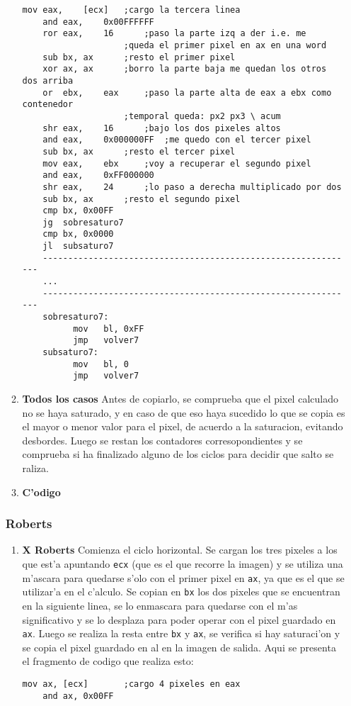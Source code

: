 \documentclass[11pt]{article}
\begin{document}
\begin{enumerate}
\begin{enumerate}
\begin{lstlisting}[frame=single]
	mov	eax,	[ecx]	;cargo la tercera linea
	and	eax,	0x00FFFFFF
	ror	eax,	16		;paso la parte izq a der i.e. me 
					;queda el primer pixel en ax en una word
	sub	bx,	ax		;resto el primer pixel
	xor	ax,	ax		;borro la parte baja me quedan los otros dos arriba
	or	ebx,	eax		;paso la parte alta de eax a ebx como contenedor 
					;temporal queda: px2 px3 \ acum
	shr	eax,	16		;bajo los dos pixeles altos
	and	eax,	0x000000FF	;me quedo con el tercer pixel
	sub	bx,	ax		;resto el tercer pixel
	mov	eax,	ebx		;voy a recuperar el segundo pixel
	and	eax,	0xFF000000
	shr	eax,	24		;lo paso a derecha multiplicado por dos
	sub	bx,	ax		;resto el segundo pixel
	cmp	bx,	0x00FF
	jg	sobresaturo7
	cmp	bx,	0x0000
	jl	subsaturo7
	--------------------------------------------------------------
	...
	--------------------------------------------------------------
	sobresaturo7:
	      mov	bl,	0xFF
	      jmp	volver7
	subsaturo7:
	      mov	bl,	0
	      jmp	volver7
\end{lstlisting}
\item \textbf{Todos los casos}
\subitem Antes de copiarlo, se comprueba que el pixel calculado no se haya saturado, y en caso de que eso haya sucedido lo que se copia es el mayor o menor valor para el pixel, de acuerdo a la saturacion, evitando desbordes.
Luego se restan los contadores corresopondientes y se comprueba si ha finalizado alguno de los ciclos para decidir que salto se raliza.
\item \textbf{C'odigo}
\end{enumerate}

\subsubsection{Roberts} 
\begin{enumerate}
\item \textbf{X Roberts}
\subitem Comienza el ciclo horizontal. Se cargan los tres pixeles a los que est'a apuntando \verb'ecx' (que es el que recorre la imagen) y se utiliza una m'ascara para quedarse s'olo con el primer pixel en \verb'ax', ya que es el que se utilizar'a en el c'alculo.
Se copian en \verb'bx' los dos pixeles que se encuentran en la siguiente linea, se lo enmascara para quedarse con el m'as significativo y se lo desplaza para poder operar con el pixel guardado en \verb'ax'.
Luego se realiza la resta entre \verb'bx' y \verb'ax', se verifica si hay saturaci'on y se copia el pixel guardado en al en la imagen de salida. Aqui se presenta el fragmento de codigo que realiza esto:
\begin{lstlisting}[frame=single]
	mov	ax,	[ecx]		;cargo 4 pixeles en eax
	and	ax,	0x00FF
	

\end{lstlisting}
\end{enumerate}
\end{enumerate}
\end{document}
